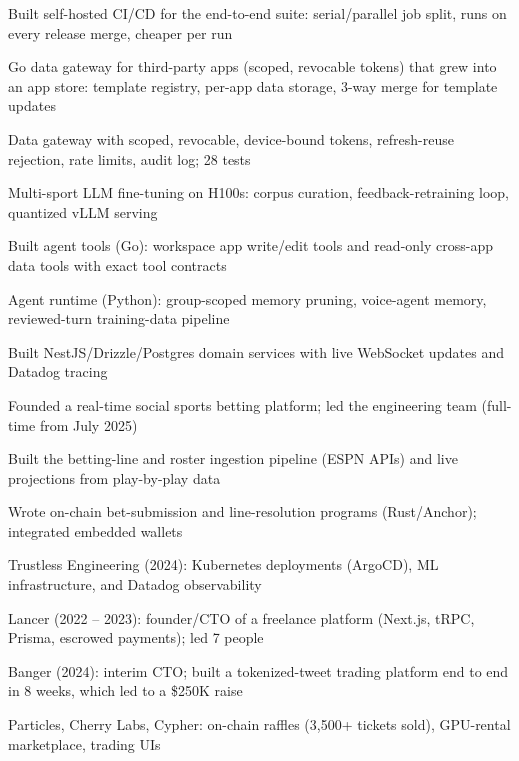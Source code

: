 \documentclass[print]{jack-resume}
\begin{document}
\begin{tightemize}
    \item Built self-hosted CI/CD for the end-to-end suite: serial/parallel job split, runs on every release merge, cheaper per run
    \item Go data gateway for third-party apps (scoped, revocable tokens) that grew into an app store: template registry, per-app data storage, 3-way merge for template updates
    \item Data gateway with scoped, revocable, device-bound tokens, refresh-reuse rejection, rate limits, audit log; 28 tests
    \item Multi-sport LLM fine-tuning on H100s: corpus curation, feedback-retraining loop, quantized vLLM serving
    \item Built agent tools (Go): workspace app write/edit tools and read-only cross-app data tools with exact tool contracts
    \item Agent runtime (Python): group-scoped memory pruning, voice-agent memory, reviewed-turn training-data pipeline
\end{tightemize}
\sectionsep

\begin{tightemize}
    \item Built NestJS/Drizzle/Postgres domain services with live WebSocket updates and Datadog tracing
    \item Founded a real-time social sports betting platform; led the engineering team (full-time from July 2025)
    \item Built the betting-line and roster ingestion pipeline (ESPN APIs) and live projections from play-by-play data
    \item Wrote on-chain bet-submission and line-resolution programs (Rust/Anchor); integrated embedded wallets
\end{tightemize}
\sectionsep

\begin{tightemize}
    \item Trustless Engineering (2024): Kubernetes deployments (ArgoCD), ML infrastructure, and Datadog observability
    \item Lancer (2022 – 2023): founder/CTO of a freelance platform (Next.js, tRPC, Prisma, escrowed payments); led 7 people
    \item Banger (2024): interim CTO; built a tokenized-tweet trading platform end to end in 8 weeks, which led to a \$250K raise
    \item Particles, Cherry Labs, Cypher: on-chain raffles (3,500+ tickets sold), GPU-rental marketplace, trading UIs
\end{tightemize}
\sectionsep
\end{document}
